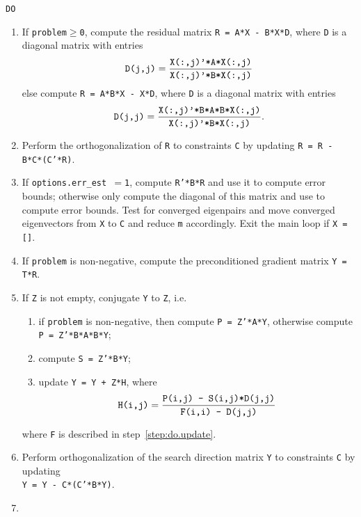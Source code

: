 \begin{itemize}
{\tt DO}
\begin{enumerate}
%
\item
\label{step:do.R}
If {\tt problem$\ge$0}, compute the residual matrix
{\tt R = A*X - B*X*D},
where {\tt D} is a  diagonal matrix with entries
%
\begin{equation}
\label{rq}
\mbox{\tt D(j,j)}=
\frac{\mbox{\tt X(:,j)'*A*X(:,j)}}
{\mbox{\tt X(:,j)'*B*X(:,j)}}
\end{equation}
%
else compute {\tt R = A*B*X - X*D},
where {\tt D} is a diagonal matrix with entries
%
\begin{equation}
\label{rq.AB}
\mbox{\tt D(j,j)}=
\frac{\mbox{\tt X(:,j)'*B*A*B*X(:,j)}}
{\mbox{\tt X(:,j)'*B*X(:,j)}}.
\end{equation}
%
\item
\label{step:do.ortho.R}
Perform the orthogonalization of {\tt R} 
to constraints {\tt C} by updating
{\tt R = R - B*C*(C'*R)}.
%
\item
\label{step:do.save}
If {\tt options.err\_est $= $1},  compute {\tt R'*B*R}
and use it to compute error bounds;
otherwise only compute the diagonal of this matrix
and use to compute error bounds.
Test for converged eigenpairs
and move converged eigenvectors from {\tt X} to {\tt C}
and reduce {\tt m} accordingly.
Exit the main loop if {\tt X = []}.
%
\item
If {\tt problem} is non-negative,
compute the preconditioned gradient
matrix {\tt Y = T*R}.
%
\item
\label{step:do.JC}
If {\tt Z} is not empty, conjugate {\tt Y} to {\tt Z}, i.e.
%
\begin{enumerate}
\item 
if {\tt problem} is non-negative,
then compute {\tt P = Z'*A*Y}, 
otherwise compute {\tt P = Z'*B*A*B*Y};
\item
compute {\tt S = Z'*B*Y};
\item
update {\tt Y = Y + Z*H},
where
\begin{equation}
\label{JC}
\mbox{\tt H(i,j)}=
\frac{\mbox{\tt P(i,j) - S(i,j)*D(j,j)}}
{\mbox{\tt F(i,i) - D(j,j)}}
\end{equation}
\end{enumerate}
where {\tt F} is described in step~\ref{step:do.update}.
%
\item
\label{step:do.ortho.Y}
Perform orthogonalization of the search direction matrix {\tt Y} 
to constraints {\tt C} by updating\\
{\tt Y = Y - C*(C'*B*Y)}.
%
\item
\label{step:do.cleanup.Y}

\end{enumerate}
\end{itemize}
